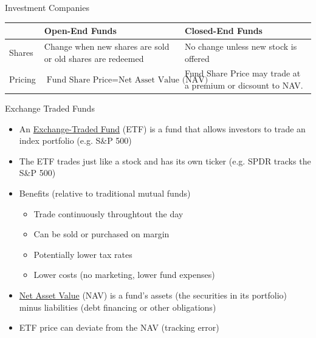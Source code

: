 \documentclass{beamer}
\renewcommand{\arraystretch}{1.5}
\begin{document}
\begin{frame}{Investment Companies}
\begin{center}
\renewcommand{\arraystretch}{1.5}
\begin{tabular}{l|p{1.5in}|p{1.5in}}
& \textbf{Open-End Funds} & \textbf{Closed-End Funds} \\ \hline
Shares & Change when new shares are sold or old shares are redeemed & No change unless new stock is offered \\ \hline
Pricing & $\text{Fund Share Price}=\text{Net Asset Value (NAV)}$ & Fund Share Price may trade at a premium or dicsount to NAV.
\end{tabular}
\end{center}
\end{frame}
\fi

\begin{frame}{Exchange Traded Funds}
	\begin{itemize}
		\item An \underline{Exchange-Traded Fund} (ETF) is a fund that allows investors to trade an index portfolio (e.g. S\&P 500)
		\item The ETF trades just like a stock and has its own ticker (e.g. SPDR tracks the S\&P 500)
		\item Benefits (relative to traditional mutual funds)
		\begin{itemize}
			\item Trade continuously throughtout the day 
			\item Can be sold or purchased on margin 
			\item Potentially lower tax rates 
			\item Lower costs (no marketing, lower fund expenses)
		\end{itemize}
		\item \underline{Net Asset Value} (NAV) is a fund's assets (the securities in its portfolio) minus liabilities (debt financing or other obligations)
		\item ETF price can deviate from the NAV (tracking error)
	\end{itemize}
\end{frame}
\end{document}
